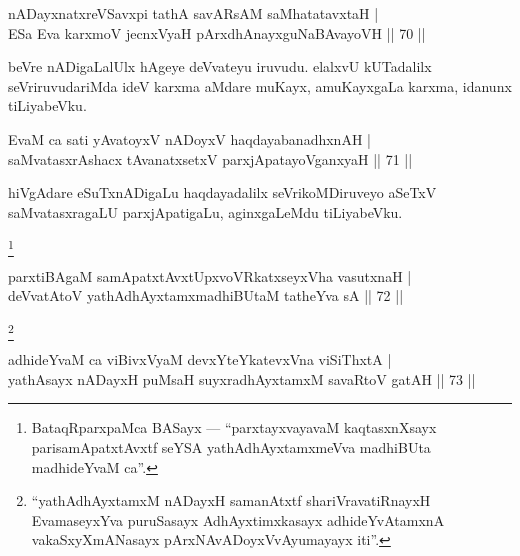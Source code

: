 \begin{shl}
\footnotemark[1]nADayxnatxreVSavxpi \footnotemark[2]tathA savARsAM saMhatatavxtaH |\\
ESa Eva karxmoV jecnxVyaH pArxdhAnayxguNaBAvayoVH \hfill || 70 || 
\end{shl}

\begin{artha}
 beVre nADigaLalUlx hAgeye deVvateyu iruvudu. elalxvU kUTadalilx seVriruvudariMda ideV karxma aMdare muKayx, amuKayxgaLa karxma, idanunx tiLiyabeVku.
\end{artha}


\begin{shl}
EvaM ca sati yAvatoyxV nADoyxV haqdayabanadhxnAH |\\
saMvatasxrAshacx tAvanatxsetxV parxjApatayoV\s ganxyaH \hfill || 71 || 
\end{shl}

\begin{artha}
hiVgAdare eSuTxnADigaLu haqdayadalilx seVrikoMDiruveyo aSeTxV saMvatasxragaLU parxjApatigaLu, aginxgaLeMdu tiLiyabeVku.
\end{artha}

\footnote{BataqRparxpaMca BASayx --- ``parxtayxvayavaM kaqtasxnXsayx parisamApatxtAvxtf seYSA yathA\s dhAyxtamxmeVva madhiBUta madhideYvaM ca''.}
\begin{shl}
parxtiBAgaM samApatxtAvxtUpxvoVRkatxseyxVha vasutxnaH |\\
deVvatA\s toV yathA\s dhAyxtamxmadhiBUtaM tatheYva sA \hfill || 72 || 
\end{shl}

\footnote{``yathA\s dhAyxtamxM nADayxH samanAtxtf shariVravatiRnayxH EvamaseyxYva puruSasayx AdhAyxtimxkasayx adhideYvAtamxnA vakaSxyXmANasayx pArxNAvADoyxVvAyumayayx iti''.}
\begin{shl}
adhideYvaM ca viBivxVyaM devxYteYkatevxVna viSiThxtA |\\
yathA\s sayx nADayxH puMsaH suyxradhAyxtamxM savaRtoV gatAH \hfill || 73 || 
\end{shl}

